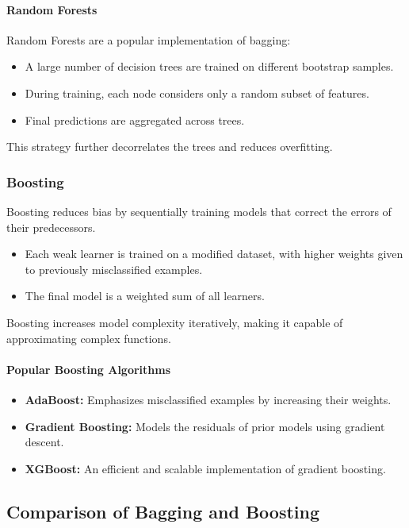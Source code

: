 \documentclass[9pt]{extarticle}
\begin{document}
\paragraph{Random Forests}

Random Forests are a popular implementation of bagging:
\begin{itemize}
    \item A large number of decision trees are trained on different bootstrap samples.
    \item During training, each node considers only a random subset of features.
    \item Final predictions are aggregated across trees.
\end{itemize}

This strategy further decorrelates the trees and reduces overfitting.

\subsubsection{Boosting}

Boosting reduces bias by sequentially training models that correct the errors of their predecessors.

\begin{itemize}
    \item Each weak learner is trained on a modified dataset, with higher weights given to previously misclassified examples.
    \item The final model is a weighted sum of all learners.
\end{itemize}

Boosting increases model complexity iteratively, making it capable of approximating complex functions.

\paragraph{Popular Boosting Algorithms}
\begin{itemize}
    \item \textbf{AdaBoost:} Emphasizes misclassified examples by increasing their weights.
    \item \textbf{Gradient Boosting:} Models the residuals of prior models using gradient descent.
    \item \textbf{XGBoost:} An efficient and scalable implementation of gradient boosting.
\end{itemize}

\subsection{Comparison of Bagging and Boosting}
\end{document}
